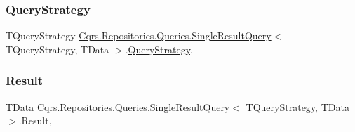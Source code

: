 \subsubsection{\texorpdfstring{Query\+Strategy}{QueryStrategy}}
{\footnotesize\ttfamily T\+Query\+Strategy \hyperlink{classCqrs_1_1Repositories_1_1Queries_1_1SingleResultQuery}{Cqrs.\+Repositories.\+Queries.\+Single\+Result\+Query}$<$ T\+Query\+Strategy, T\+Data $>$.\hyperlink{classCqrs_1_1Repositories_1_1Queries_1_1QueryStrategy}{Query\+Strategy}\hspace{0.3cm}{\ttfamily [get]}, {\ttfamily [set]}}

\mbox{\label{classCqrs_1_1Repositories_1_1Queries_1_1SingleResultQuery_a8ec51fe4bb5f1c9f1f62abdf9cf7c370}} 
\subsubsection{\texorpdfstring{Result}{Result}}
{\footnotesize\ttfamily T\+Data \hyperlink{classCqrs_1_1Repositories_1_1Queries_1_1SingleResultQuery}{Cqrs.\+Repositories.\+Queries.\+Single\+Result\+Query}$<$ T\+Query\+Strategy, T\+Data $>$.Result\hspace{0.3cm}{\ttfamily [get]}, {\ttfamily [set]}}

